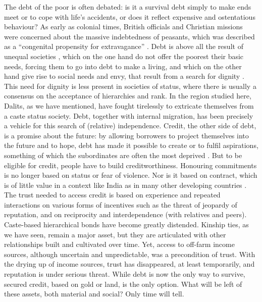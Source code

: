 \documentclass[a4paper, 11pt, onecolumn]{article}
\begin{document}
The debt of the poor is often debated: is it a survival debt simply to make ends meet or to cope with life's accidents, or does it reflect expensive and ostentatious behaviour? 
As early as colonial times, British officials and Christian missions were concerned about the massive indebtedness of peasants, which was described as a ``congenital propensity for extravagance'' \citep[p.167]{Pouchepadass1980}. 
Debt is above all the result of unequal societies \citep{UN2020}, which on the one hand do not offer the poorest their basic needs, forcing them to go into debt to make a living, and which on the other hand give rise to social needs and envy, that result from a search for dignity \citep{Servet2013}. 
This need for dignity is less present in societies of status, where there is usually a consensus on the acceptance of hierarchies and rank. 
In the region studied here, Dalits, as we have mentioned, have fought tirelessly to extricate themselves from a caste status society. 
Debt, together with internal migration, has been precisely a vehicle for this search of (relative) independence. 
Credit, the other side of debt, is a promise about the future: by allowing borrowers to project themselves into the future and to hope, debt has made it possible to create or to fulfil aspirations, something of which the subordinates are often the most deprived \citep{Appadurai2004}. 
But to be eligible for credit, people have to build creditworthiness. 
Honouring commitments is no longer based on status or fear of violence. 
Nor is it based on contract, which is of little value in a context like India \citep{Harriss-White2003} as in many other developing countries \citep{Platteau1994}. 
The trust needed to access credit is based on experience and repeated interactions \citep{Hilger2020} on various forms of incentives such as the threat of jeopardy of reputation, and on reciprocity and interdependence (with relatives and peers). 
Caste-based hierarchical bonds have become greatly distended. 
Kinship ties, as we have seen, remain a major asset, but they are articulated with other relationships built and cultivated over time. 
Yet, access to off-farm income sources, although uncertain and unpredictable, was a precondition of trust. 
With the drying up of income sources, trust has disappeared, at least temporarily, and reputation is under serious threat. 
While debt is now the only way to survive, secured credit, based on gold or land, is the only option.
What will be left of these assets, both material and social? 
Only time will tell.
\end{document}
